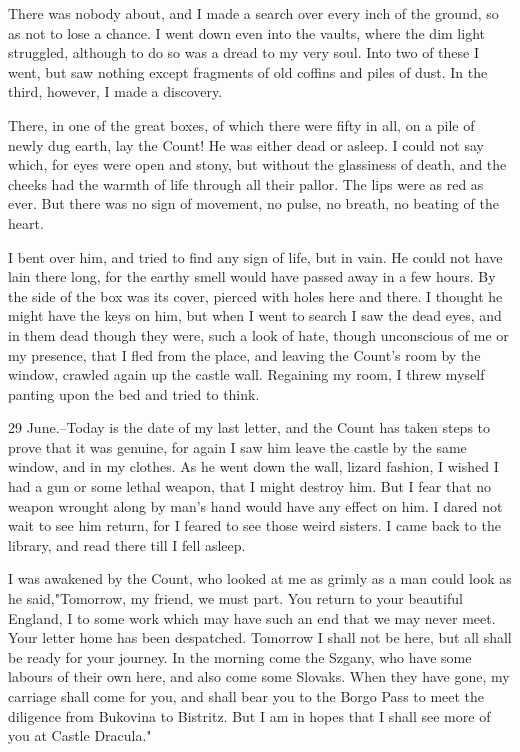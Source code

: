 There was nobody about, and I made a search over every inch of the ground, so as not to lose a chance. I went down even into the vaults, where the dim light struggled, although to do so was a dread to my very soul. Into two of these I went, but saw nothing except fragments of old coffins and piles of dust. In the third, however, I made a discovery. 

There, in one of the great boxes, of which there were fifty in all, on a pile of newly dug earth, lay the Count! He was either dead or asleep. I could not say which, for eyes were open and stony, but without the glassiness of death, and the cheeks had the warmth of life through all their pallor. The lips were as red as ever. But there was no sign of movement, no pulse, no breath, no beating of the heart. 

I bent over him, and tried to find any sign of life, but in vain. He could not have lain there long, for the earthy smell would have passed away in a few hours. By the side of the box was its cover, pierced with holes here and there. I thought he might have the keys on him, but when I went to search I saw the dead eyes, and in them dead though they were, such a look of hate, though unconscious of me or my presence, that I fled from the place, and leaving the Count's room by the window, crawled again up the castle wall. Regaining my room, I threw myself panting upon the bed and tried to think. 

29 June.--Today is the date of my last letter, and the Count has taken steps to prove that it was genuine, for again I saw him leave the castle by the same window, and in my clothes. As he went down the wall, lizard fashion, I wished I had a gun or some lethal weapon, that I might destroy him. But I fear that no weapon wrought along by man's hand would have any effect on him. I dared not wait to see him return, for I feared to see those weird sisters. I came back to the library, and read there till I fell asleep. 

I was awakened by the Count, who looked at me as grimly as a man could look as he said,"Tomorrow, my friend, we must part. You return to your beautiful England, I to some work which may have such an end that we may never meet. Your letter home has been despatched. Tomorrow I shall not be here, but all shall be ready for your journey. In the morning come the Szgany, who have some labours of their own here, and also come some Slovaks. When they have gone, my carriage shall come for you, and shall bear you to the Borgo Pass to meet the diligence from Bukovina to Bistritz. But I am in hopes that I shall see more of you at Castle Dracula." 


